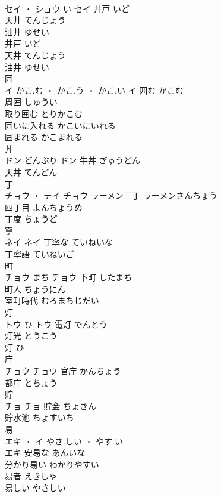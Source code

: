 \documentclass[8pt]{extreport}
\begin{document}
\begin{CJK}{UTF8}{min}
\\	セイ ・ ショウ	い	セイ	井戸	いど	
\\	天井	てんじょう	
\\	油井	ゆせい	
\\	井戸	いど	
\\	天井	てんじょう	
\\	油井	ゆせい	
\\	囲	
\\	イ	かこ.む ・ かこ.う ・ かこ.い	イ	囲む	かこむ	
\\	周囲	しゅうい	
\\	取り囲む	とりかこむ	
\\	囲いに入れる	かこいにいれる	
\\	囲まれる	かこまれる	
\\	丼	
\\	ドン	どんぶり	ドン													牛丼	ぎゅうどん	
\\	天丼	てんどん	
\\	丁	
\\	チョウ ・ テイ		チョウ													ラーメン三丁	ラーメンさんちょう	
\\	四丁目	よんちょうめ	
\\	丁度	ちょうど	
\\	寧	
\\	ネイ		ネイ	丁寧な	ていねいな	
\\	丁寧語	ていねいご	
\\	町	
\\	チョウ	まち	チョウ	下町	したまち	
\\	町人	ちょうにん	
\\	室町時代	むろまちじだい	
\\	灯	
\\	トウ	ひ	トウ	電灯	でんとう	
\\	灯光	とうこう	
\\	灯	ひ	
\\	庁	
\\	チョウ		チョウ	官庁	かんちょう	
\\	都庁	とちょう	
\\	貯	
\\	チョ		チョ	貯金	ちょきん	
\\	貯水池	ちょすいち	
\\	易	
\\	エキ ・ イ	やさ.しい ・ やす.い
\\	エキ	安易な	あんいな	
\\	分かり易い	わかりやすい	
\\	易者	えきしゃ	
\\	易しい	やさしい	

\end{CJK}
\end{document}
